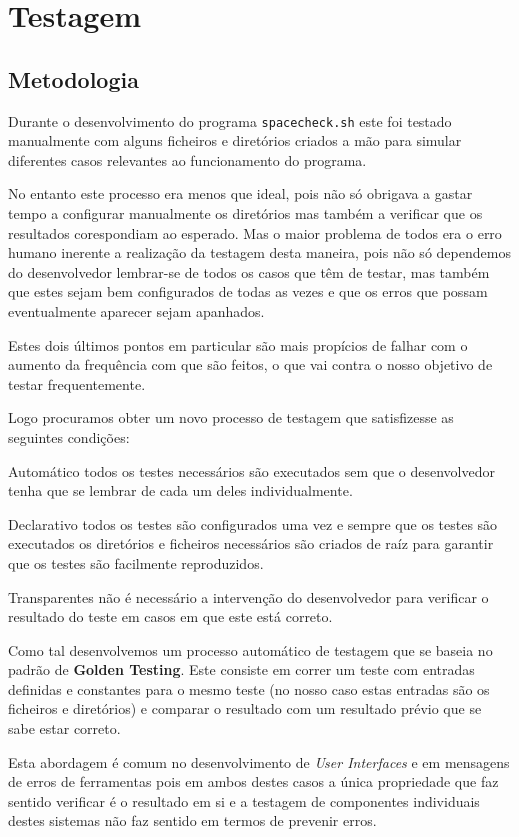 \chapter{Testagem}

\section{Metodologia}

Durante o desenvolvimento do programa \Verb|spacecheck.sh| este foi testado
manualmente com alguns ficheiros e diretórios criados a mão para simular
diferentes casos relevantes ao funcionamento do programa.

No entanto este processo era menos que ideal, pois não só obrigava a gastar
tempo a configurar manualmente os diretórios mas também a verificar que os
resultados corespondiam ao esperado. Mas o maior problema de todos era o erro
humano inerente a realização da testagem desta maneira, pois não só dependemos
do desenvolvedor lembrar-se de todos os casos que têm de testar, mas também que
estes sejam bem configurados de todas as vezes e que os erros que possam
eventualmente aparecer sejam apanhados.

Estes dois últimos pontos em particular são mais propícios de falhar com o
aumento da frequência com que são feitos, o que vai contra o nosso objetivo
de testar frequentemente.

Logo procuramos obter um novo processo de testagem que satisfizesse as seguintes
condições:

\begin{enumdescript}
	\item[Automático]
	todos os testes necessários são executados sem que o desenvolvedor tenha que
	se lembrar de cada um deles individualmente.
	\item[Declarativo]
	todos os testes são configurados uma vez e sempre que os testes são
	executados os diretórios e ficheiros necessários são criados de raíz
	para garantir que os testes são facilmente reproduzidos.
	\item[Transparentes]
	não é necessário a intervenção do desenvolvedor para verificar o resultado
	do teste em casos em que este está correto.
\end{enumdescript}

Como tal desenvolvemos um processo automático de testagem que se baseia no
padrão de \textbf{Golden Testing}. Este consiste em correr um teste com entradas
definidas e constantes para o mesmo teste (no nosso caso estas entradas são os
ficheiros e diretórios) e comparar o resultado com um resultado prévio que se
sabe estar correto.

Esta abordagem é comum no desenvolvimento de \emph{User Interfaces} e em
mensagens de erros de ferramentas pois em ambos destes casos a única propriedade
que faz sentido verificar é o resultado em si e a testagem de componentes
individuais destes sistemas não faz sentido em termos de prevenir erros.
